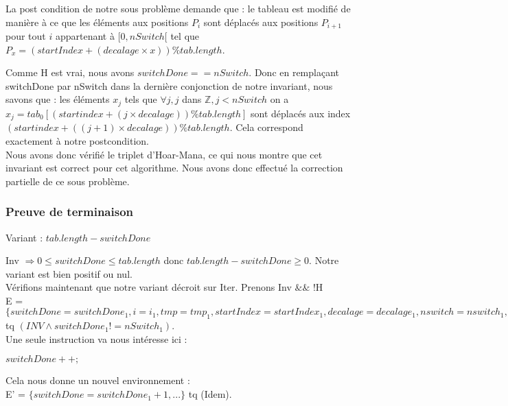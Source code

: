 La post condition de notre sous problème demande que : le tableau est modifié de manière à ce que les éléments aux positions $P_{i}$ sont déplacés aux positions $P_{i+1}$ pour tout $i$ appartenant à $[0,nSwitch[$ tel que $P_{x} = (startIndex + (decalage\times x)) \% tab.length$.

Comme H est vrai, nous avons $switchDone == nSwitch$. Donc en remplaçant switchDone par nSwitch dans la dernière conjonction de notre invariant, nous savons que : les éléments $x_{j}$ tels que $\forall j, j$ dans $\mathbb{Z}, j<nSwitch$ on a $x_{j}=tab_{0}[(startindex + (j\times decalage)) \% tab.length]$ sont déplacés aux index $(startindex + ((j+1)\times decalage)) \% tab.length.$ 
Cela correspond exactement à notre postcondition.\\

Nous avons donc vérifié le triplet d'Hoar-Mana, ce qui nous montre que cet invariant est correct pour cet algorithme. 
Nous avons donc effectué la correction partielle de ce sous problème. 


\subsubsection*{Preuve de terminaison}
Variant  : $tab.length - switchDone$

Inv $\Rightarrow 0 \leq switchDone \leq tab.length$ donc $tab.length - switchDone \geq 0$. Notre variant est bien positif ou nul.\\ 

Vérifions maintenant que notre variant décroit sur Iter. Prenons Inv $\&\&$ !H \\

E = $\{ switchDone = switchDone_{1}, i = i_{1}, tmp = tmp_{1}, startIndex = startIndex_{1}, decalage = decalage_{1}, nswitch = nswitch_{1}, tab = tab_{1}\}$\\
tq $(INV \wedge switchDone_{1} != nSwitch_{1})$.\\

Une seule instruction va nous intéresse ici : \\

\begin{center}
  $switchDone++;$\\
 \end{center} 
 
Cela nous donne un nouvel environnement :\\

E' = $\{switchDone = switchDone_{1}+1, ...\}$ tq (Idem).\\

